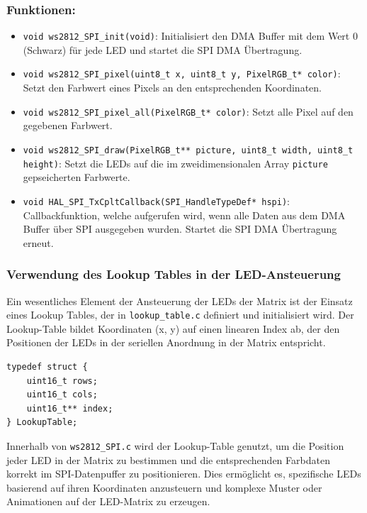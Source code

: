 \subsubsection*{Funktionen:}
{\renewcommand\labelitemi{}
\begin{itemize}[leftmargin=*]
    \item \texttt{void ws2812\_SPI\_init(void)}: Initialisiert den DMA Buffer mit dem Wert 0 (Schwarz) für jede LED und startet die SPI DMA Übertragung.
    \item \texttt{void ws2812\_SPI\_pixel(uint8\_t x, uint8\_t y, PixelRGB\_t* color)}: Setzt den Farbwert eines Pixels an den entsprechenden Koordinaten.
    \item \texttt{void ws2812\_SPI\_pixel\_all(PixelRGB\_t* color)}: Setzt alle Pixel auf den gegebenen Farbwert.
    \item \texttt{void ws2812\_SPI\_draw(PixelRGB\_t** picture, uint8\_t width, uint8\_t height)}: Setzt die LEDs auf die im zweidimensionalen Array \texttt{picture} gepseicherten Farbwerte.
    \item \texttt{void HAL\_SPI\_TxCpltCallback(SPI\_HandleTypeDef* hspi)}: Callbackfunktion, welche aufgerufen wird, wenn alle Daten aus dem DMA Buffer über SPI ausgegeben wurden. Startet die SPI DMA Übertragung erneut.
\end{itemize}
}

\subsubsection*{Verwendung des Lookup Tables in der LED-Ansteuerung}

Ein wesentliches Element der Ansteuerung der LEDs der Matrix ist der Einsatz eines Lookup Tables, der in \texttt{lookup\_table.c} definiert und initialisiert wird. Der Lookup-Table bildet Koordinaten (x, y) auf einen linearen Index ab, der den Positionen der LEDs in der seriellen Anordnung in der Matrix entspricht.

\begin{lstlisting}[style=CStyle]
typedef struct {
    uint16_t rows;
    uint16_t cols;
    uint16_t** index;
} LookupTable;
\end{lstlisting}

Innerhalb von \texttt{ws2812\_SPI.c} wird der Lookup-Table genutzt, um die Position jeder LED in der Matrix zu bestimmen und die entsprechenden Farbdaten korrekt im SPI-Datenpuffer zu positionieren. Dies ermöglicht es, spezifische LEDs basierend auf ihren Koordinaten anzusteuern und komplexe Muster oder Animationen auf der LED-Matrix zu erzeugen.

